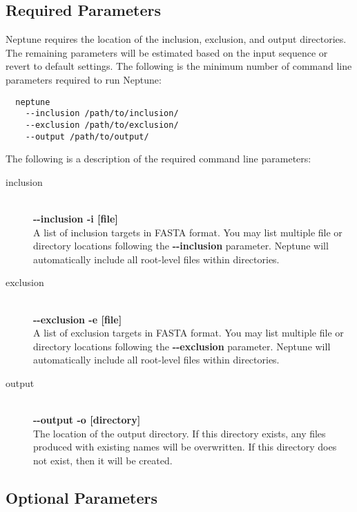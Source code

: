 \documentclass[a4paper,10pt]{article}
\begin{document}
\subsection{Required Parameters}

Neptune requires the location of the inclusion, exclusion, and output directories. The remaining parameters will be estimated based on the input sequence or revert to default settings. The following is the minimum number of command line parameters required to run Neptune:

\begin{verbatim}
  neptune
    --inclusion /path/to/inclusion/
    --exclusion /path/to/exclusion/
    --output /path/to/output/
\end{verbatim}

The following is a description of the required command line parameters:

\begin{description}

  \item[inclusion] \hfill \\
  \textbf{-{}-inclusion -i [file]} \hfill \\
  A list of inclusion targets in FASTA format. You may list multiple file or directory locations following the \textbf{-{}-inclusion} parameter. Neptune will automatically include all root-level files within directories.  
  
  \item[exclusion] \hfill \\
  \textbf{-{}-exclusion -e [file]} \hfill \\
  A list of exclusion targets in FASTA format. You may list multiple file or directory locations following the \textbf{-{}-exclusion} parameter. Neptune will automatically include all root-level files within directories.
  
  \item[output] \hfill \\
  \textbf{-{}-output -o [directory]} \hfill \\
  The location of the output directory. If this directory exists, any files produced with existing names will be overwritten. If this directory does not exist, then it will be created.
  
\end{description}

\subsection{Optional Parameters}
\end{document}

